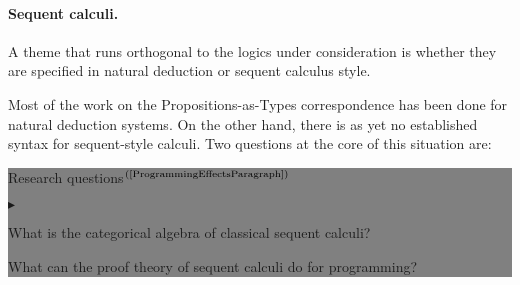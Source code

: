 \documentclass[11pt,twocolumn]{article}
\newenvironment{btritemize}
  {\begin{list}{\btr}
  {\setlength{\topsep}{2pt}
   \setlength{\partopsep}{2pt}
   \setlength{\itemsep}{2.5pt}
   \setlength{\parsep}{2.5pt}
   \setlength{\leftmargin}{1em}
   \setlength{\labelwidth}{.5em}}}
  {\end{list}}
\newcommand{\mytextsf}[1]{\textsf{\small #1}}
\newcommand{\hide}[1]{}
\newcommand{\eg}{\emph{eg.}}
\newcommand{\btr}{$\blacktriangleright$}
\newcommand{\reqpsize}{8.113395cm}%
\newcommand{\req}[2]{\begin{center}\colorbox{grey}{\begin{minipage}{\reqpsize} 
  \mytextsf{Research question}\hfill$^{\mbox{\scriptsize #1 }}$\\[-5.5mm]
  \begin{btritemize}
  \item #2
  \end{btritemize}
\end{minipage}}\end{center}}
\newcommand{\reqs}[2]{\begin{center}\colorbox{grey}{\begin{minipage}{\reqpsize}
  \mytextsf{Research questions}\hfill$^{\mbox{\scriptsize #1 }}$\\[-5.5mm]
  \begin{btritemize}
  \item #2
  \end{btritemize}
\end{minipage}}\end{center}}
\newcommand{\rep}[2]{\begin{center}\colorbox{grey}{\begin{minipage}{\reqpsize}
  \mytextsf{Research pathway}\hfill$^{\mbox{\scriptsize #1 }}$\\[-5.5mm]
  \begin{btritemize}
  \item #2
  \end{btritemize}
\end{minipage}}\end{center}}
\begin{document}
\hide{
From the logical point of view, resource and effect structure are so-called
modal operators, and some of the literature has indeed considered them as
such.  %
The field of modal logics is broad, with many subfields of specialised logics
motivated by computation, linguistics, and philosophy.  While a class of modal
logics known as temporal logics have played a prominent role, and been very
successful, in the area of computer aided verification; the impact of modal
logics on programming languages has been peripheral.  It is thus natural and
important to reconsider them in this context. 
%
\rep{(\ref{ModalLogicsParagraph}\,\&\,\ref{MetaprogrammingParagraph})}
  {Investigate the Propositions-as-Types 
    correspondence %
    for modal logics, and apply it to programming languages.}
We stress that we are specially interested in modalities for computation with
reflection.
}

\paragraph{Sequent calculi.}
\label{SequentCalculiParagraph}

A theme that runs orthogonal to the logics under consideration is whether
they are specified in natural deduction or sequent calculus
style. %

Most of the work on the Propositions-as-Types correspondence has been done for
natural deduction systems. %
%
On the other hand, there is as yet no established syntax for sequent-style
calculi.  
Two questions at the core of this situation are:
%
\reqs{(\ref{ProgrammingEffectsParagraph})}
  {What is the categorical algebra of classical sequent calculi? %
%
\hide{
Nevertheless, a syntactic formalism that is proving robust in applications
seems to be emerging.  This will be referred to as the calculus,
formalism, or system~\SysL; and underlies the ones developed
in~\eg~\cite{CurienHerbelin,Wadler,Munch,CurienMunch}.

The main novel features of the formalism~\SysL, and its philosophy, are an
intrinsic symmetry (corresponding to the computation roles of program and
environment) with syntax that reflects an adjoint situation and is closely
connected to abstract machines (which are in fact internal to the
calculus).  From this perspective we ask:
}
%
  What can the proof theory of sequent calculi do for programming?}
\end{document}
